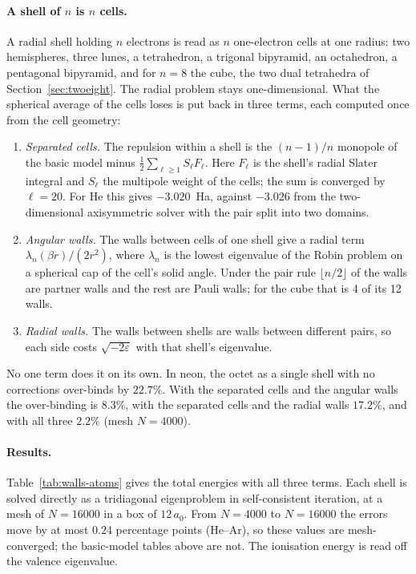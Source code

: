 \paragraph{A shell of $n$ is $n$ cells.} A radial shell holding $n$ electrons is read as $n$ one-electron
cells at one radius: two hemispheres, three lunes, a tetrahedron, a trigonal bipyramid, an octahedron, a
pentagonal bipyramid, and for $n=8$ the cube, the two dual tetrahedra of Section~\ref{sec:twoeight}. The
radial problem stays one-dimensional. What the spherical average of the cells loses is put back in three
terms, each computed once from the cell geometry:
\begin{enumerate}
\item \emph{Separated cells.} The repulsion within a shell is the $(n-1)/n$ monopole of the basic model
minus $\tfrac12\sum_{\ell\ge1}S_\ell F_\ell$. Here $F_\ell$ is the shell's radial Slater integral and $S_\ell$
the multipole weight of the cells; the sum is converged by $\ell=20$. For He this gives $-3.020$~Ha, against
$-3.026$ from the two-dimensional axisymmetric solver with the pair split into two domains.
\item \emph{Angular walls.} The walls between cells of one shell give a radial term
$\lambda_n(\beta r)/(2r^2)$, where $\lambda_n$ is the lowest eigenvalue of the Robin problem on a spherical
cap of the cell's solid angle. Under the pair rule $\lfloor n/2\rfloor$ of the walls are partner walls and the
rest are Pauli walls; for the cube that is 4 of its 12 walls.
\item \emph{Radial walls.} The walls between shells are walls between different pairs, so each side costs
$\sqrt{-2\varepsilon}$ with that shell's eigenvalue.
\end{enumerate}
No one term does it on its own. In neon, the octet as a single shell with no corrections over-binds by
$22.7\%$. With the separated cells and the angular walls the over-binding is $8.3\%$, with the separated cells
and the radial walls $17.2\%$, and with all three $2.2\%$ (mesh $N=4000$).

\paragraph{Results.} Table~\ref{tab:walls-atoms} gives the total energies with all three terms. Each shell is
solved directly as a tridiagonal eigenproblem in self-consistent iteration, at a mesh of $N=16000$ in a box of
$12\,a_0$. From $N=4000$ to $N=16000$ the errors move by at most $0.24$ percentage points (He--Ar), so these
values are mesh-converged; the basic-model tables above are not. The ionisation energy is read off the
valence eigenvalue.

